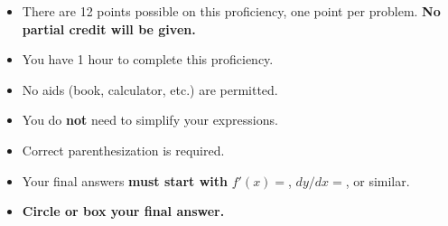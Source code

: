 \documentclass[12pt]{article}
\begin{document}
\begin{itemize}
\addtolength\itemsep{-1mm}
\item There are 12 points possible on this proficiency, one point per problem. {\bf No partial credit will be given.}

\item You have 1 hour to complete this proficiency.

\item No aids (book, calculator, etc.) are permitted.  

\item You do \textbf{not} need to simplify your expressions.

\item Correct parenthesization is required.



\item Your final answers \textbf{must start with} $f'(x)=$, $dy/dx=$, or similar.

\item {\bf Circle or box your final answer.}
\end{itemize}
\end{document}
